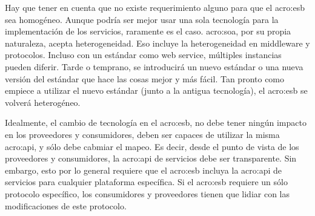 Hay que tener en cuenta que no existe requerimiento alguno para que el \gls{acro:esb} sea homogéneo.  Aunque podría ser mejor usar una sola tecnología para la implementación de los servicios, raramente es el caso. \gls{acro:soa}, por su propia naturaleza, acepta heterogeneidad. Eso incluye la heterogeneidad en middleware y protocolos. Incluso con un estándar como web service, múltiples instancias pueden diferir.  Tarde o temprano, se introducirá un nuevo estándar o una nueva versión del estándar que hace las cosas mejor y más fácil. Tan pronto como empiece a utilizar el nuevo estándar (junto a la antigua tecnología), el \gls{acro:esb} se volverá heterogéneo.\cite[p.~49]{josuttis2007}

Idealmente, el cambio de tecnología en el \gls{acro:esb}, no debe tener ningún impacto en los proveedores y consumidores, deben ser capaces de utilizar la misma \gls{acro:api}, y sólo debe cabmiar el mapeo.
Es decir, desde el punto de vista de los proveedores y consumidores, la \gls{acro:api} de servicios debe ser transparente. Sin embargo, esto por lo general requiere que el \gls{acro:esb} incluya la \gls{acro:api} de servicios para cualquier plataforma específica. Si el \gls{acro:esb} requiere un sólo protocolo específico, los consumidores y proveedores tienen que lidiar con las modificaciones de este protocolo.\cite[p.~50]{josuttis2007}
